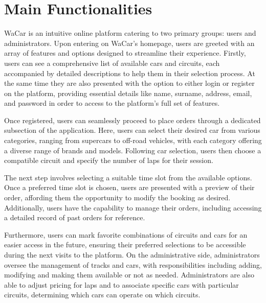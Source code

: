 \section{Main Functionalities}


WaCar is an intuitive online platform catering to two primary groups: users and administrators. Upon entering on WaCar's homepage, users are greeted with an array of features and options designed to streamline their experience. Firstly, users can see a comprehensive list of available cars and circuits, each accompanied by detailed descriptions to help them in their selection process. At the same time they are also presented with the option to either login or register on the platform, providing essential details like name, surname, address, email, and password in order to access to the platform's full set of features.

Once registered, users can seamlessly proceed to place orders through a dedicated subsection of the application. Here, users can select their desired car from various categories, ranging from supercars to off-road vehicles, with each category offering a diverse range of brands and models. Following car selection, users then choose a compatible circuit and specify the number of laps for their session.

The next step involves selecting a suitable time slot from the available options. Once a preferred time slot is chosen, users are presented with a preview of their order, affording them the opportunity to modify the booking as desired. Additionally, users have the capability to manage their orders, including accessing a detailed record of past orders for reference.

Furthermore, users can mark favorite combinations of circuits and cars for an easier access in the future, ensuring their preferred selections to be accessible during the next visits to the platform.
On the administrative side, administrators oversee the management of tracks and cars, with responsibilities including adding, modifying and making them available or not as needed. Administrators are also able to adjust pricing for laps and to associate specific cars with particular circuits, determining which cars can operate on which circuits.